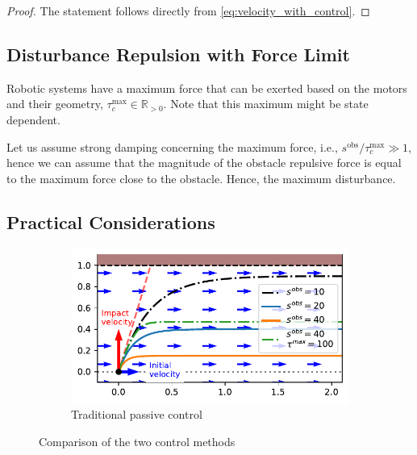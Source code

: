 \documentclass[conference]{IEEEtran}
\begin{document}
\begin{proof}
The statement follows directly from \eqref{eq:velocity_with_control}.
\end{proof}

\subsection{Disturbance Repulsion with Force Limit}
Robotic systems have a maximum force that can be exerted based on the motors and their geometry, $\tau_c^{\mathrm{max}} \in \mathbb{R}_{>0}$. Note that this maximum might be state dependent.

Let  us assume strong damping concerning the maximum force, i.e., $s^{\mathrm{obs}} / \tau_c^{\mathrm{max}} \gg 1$, hence we can assume that the magnitude of the obstacle repulsive force is equal to the maximum force close to the obstacle. Hence, the maximum disturbance.

\subsection{Practical Considerations}

\begin{figure}
\centering
\begin{subfigure}{0.99\columnwidth}
  \centerline{\includegraphics[width=\textwidth]{figures/parallel_avoidance_obstacle}}
  \caption{Traditional passive control}
\end{subfigure}
\caption{Comparison of the two control methods}
\label{fig:collision_avoidance}
\end{figure}
\end{document}
